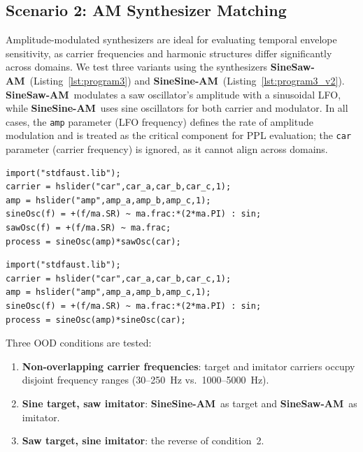 \documentclass[14pt]{extarticle} %
\newcommand{\FMMod}{\textbf{SineSaw-AM}\xspace}
\newcommand{\FMModvtwo}{\textbf{SineSine-AM}\xspace}
\begin{document}
\subsection{Scenario 2: AM Synthesizer Matching}
Amplitude-modulated synthesizers are ideal for evaluating temporal envelope sensitivity, as carrier frequencies and harmonic structures differ significantly across domains.  
We test three variants using the synthesizers \FMMod\ (Listing~\ref{lst:program3}) and \FMModvtwo\ (Listing~\ref{lst:program3_v2}).  
\FMMod\ modulates a saw oscillator’s amplitude with a sinusoidal LFO, while \FMModvtwo\ uses sine oscillators for both carrier and modulator.  
In all cases, the \texttt{amp} parameter (LFO frequency) defines the rate of amplitude modulation and is treated as the critical component for PPL evaluation; the \texttt{car} parameter (carrier frequency) is ignored, as it cannot align across domains.

\begin{lstlisting}[caption={\FMMod}, label={lst:program3},language=Faust,float,floatplacement=!H,xleftmargin=1em,xrightmargin=0.5em,firstnumber=0,aboveskip=0em, belowskip=-1em]
import("stdfaust.lib");
carrier = hslider("car",car_a,car_b,car_c,1);
amp = hslider("amp",amp_a,amp_b,amp_c,1);
sineOsc(f) = +(f/ma.SR) ~ ma.frac:*(2*ma.PI) : sin;
sawOsc(f) = +(f/ma.SR) ~ ma.frac;
process = sineOsc(amp)*sawOsc(car);
\end{lstlisting}

\begin{lstlisting}[caption={\FMModvtwo}, label={lst:program3_v2},language=Faust,float,floatplacement=!H,xleftmargin=1em,xrightmargin=0.5em,firstnumber=0,aboveskip=0em, belowskip=-1em]
import("stdfaust.lib");
carrier = hslider("car",car_a,car_b,car_c,1);
amp = hslider("amp",amp_a,amp_b,amp_c,1);
sineOsc(f) = +(f/ma.SR) ~ ma.frac:*(2*ma.PI) : sin;
process = sineOsc(amp)*sineOsc(car);
\end{lstlisting}

Three OOD conditions are tested:
\begin{enumerate}
  \item \textbf{Non-overlapping carrier frequencies}: target and imitator carriers occupy disjoint frequency ranges (30–250~Hz vs.~1000–5000~Hz).  
  \item \textbf{Sine target, saw imitator}: \FMModvtwo\ as target and \FMMod\ as imitator.  
  \item \textbf{Saw target, sine imitator}: the reverse of condition~2.  
\end{enumerate}
\end{document}
